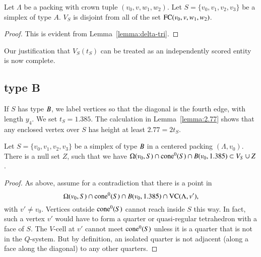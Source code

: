 \begin{lemma}
Let $\Lambda$ be a packing with crown tuple $(v_0,v,w_1,w_2)$.
Let $S=\{v_0,v_1,v_2,v_3\}$ be a simplex of type $A$.
  $V_S$ is disjoint from all of the set ${\operatorname{FC}}(v_0,v,w_1,w_2)$.
\end{lemma}

\begin{proof}
This is evident from
Lemma~\ref{lemma:delta-tri}. %
\end{proof}


Our justification that $V_S(t_S)$ can be treated as an
independently scored entity is now complete.

\subsection{type B}%

If $S$ has type $B$, we label vertices so that
the diagonal is the fourth edge, with length $y_4$. We set
$t_S=1.385$. The calculation in Lemma~\ref{lemma:2.77}
shows that any enclosed vertex over $S$ has height at least
$2.77=2t_S$.

\begin{lemma} 
Let $S=\{v_0,v_1,v_2,v_3\}$ be a simplex of type $B$ in a centered packing $(\Lambda,v_0)$.
There is a null set $Z$, such that
we have  $ \Omega(v_0,S) \cap {\operatorname{cone}}^0(S) \cap B(v_0,1.385) 
\subset V_S \cup Z$.
\end{lemma}

\begin{proof}  As above, assume for a contradiction that there
is a point in 
 $$\Omega(v_0,S)\cap {\operatorname{cone}}^0(S) \cap B(v_0,1.385)\cap {\operatorname{VC}}(\Lambda,v'),$$
with $v'\ne v_0$.
Vertices outside ${\operatorname{cone}}^0(S)$ cannot reach inside $S$ this way.  In
fact, such a vertex $v'$ would have to form a quarter or
quasi-regular tetrahedron with a face of $S$.  The $V$-cell at
$v'$ cannot meet ${\operatorname{cone}}^0(S)$ unless it is a quarter that is not in the
$Q$-system. But by definition, an isolated quarter is not adjacent
(along a face along the diagonal) to any other quarters.
\end{proof}


